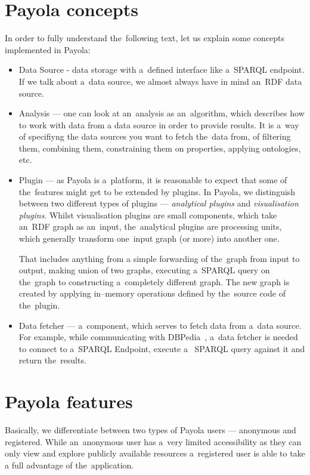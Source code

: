 \section{Payola concepts}
In order to fully understand the~following text, let us explain some concepts 
implemented in Payola:
\begin{itemize}
  \item Data Source - data storage with a~defined interface like a~SPARQL endpoint.
  If we talk about a~data source, we almost always have in mind an~RDF data source.
  
  \item Analysis --- one can look at an~analysis as an~algorithm, which 
  describes how to work with data from a data source in order to provide results. 
  It is a~way of specifiyng the data sources you want to fetch the~data from, 
  of filtering them, combining them, constraining them on properties, applying 
  ontologies, etc.
  
  \item Plugin --- as Payola is a~platform, it is reasonable to expect that 
  some of the~features might get to be extended by plugins. In 
  Payola, we distinguish between two different types of plugins --- \emph{analytical plugins} and 
  \emph{visualisation plugins}. Whilst visualisation plugins are small components, 
  which take an~RDF graph as an~input, the~analytical plugins are processing 
  units, which generally transform one~input graph (or more) into another one.
  
  That includes anything from a simple forwarding of the~graph from input to output, 
  making union of two graphs, executing a~SPARQL query on the~graph to constructing 
  a~completely different graph. The new graph is created by applying in--memory
  operations defined by the~source code of the~plugin.
  
  \item Data fetcher --- a~component, which serves to fetch data from a~data 
  source. For example, while communicating with DBPedia~\cite{dbpedia},
  a~data fetcher is needed to connect to a~SPARQL Endpoint, execute a~
  SPARQL query against it and return the~results.
\end{itemize}

\section{Payola features}
Basically, we differentiate between two types of Payola users --- anonymous and registered. 
While an~anonymous user has a~very limited accessibility as they can only 
view and explore publicly available resources a~registered user is able to 
take a full advantage of the~application.


